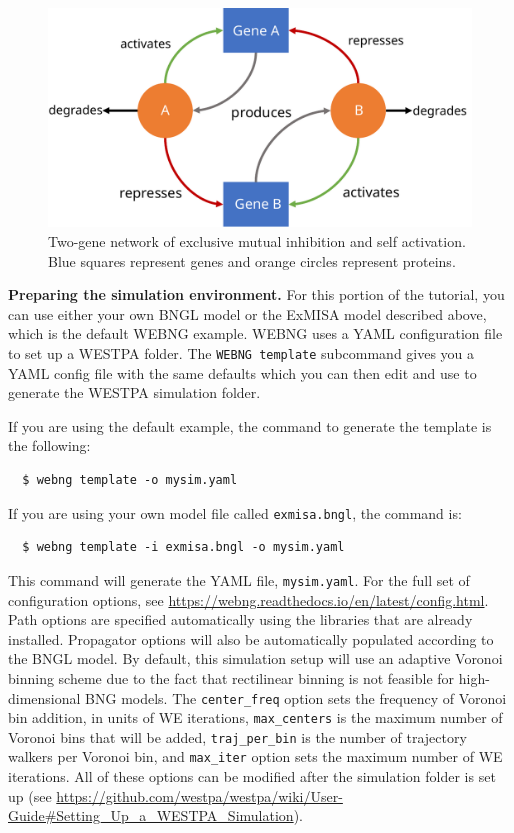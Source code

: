 \begin{figure}[t]
\centering
\includegraphics[width=\columnwidth]{figures/Figure13_Network.pdf}
\caption{Two-gene network of exclusive mutual inhibition and self activation.  Blue squares represent genes and orange circles represent proteins.}
\label{fig:two-gene-model}
\end{figure}

\textbf{Preparing the simulation environment.} For this portion of the tutorial, you can use either your own BNGL model or the ExMISA model described above, which is the default WEBNG example. 
WEBNG uses a YAML configuration file to set up a WESTPA folder. 
The \verb|WEBNG template| subcommand gives you a YAML config file with the same defaults which you can then edit and use to generate the WESTPA simulation folder. 

If you are using the default example, the command to generate the template is the following:
\begin{verbatim}
  $ webng template -o mysim.yaml 
\end{verbatim}

If you are using your own model file called \verb|exmisa.bngl|, the command is:
\begin{verbatim}
  $ webng template -i exmisa.bngl -o mysim.yaml
\end{verbatim}

This command will generate the YAML file, \verb|mysim.yaml|. For the full set of configuration options, see {\url{https://webng.readthedocs.io/en/latest/config.html}}. 
Path options are specified automatically using the libraries that are already installed. 
Propagator options will also be automatically populated according to the BNGL model. 
By default, this simulation setup will use an adaptive Voronoi binning scheme \citep{zhang_exact_2010} due to the fact that rectilinear binning is not feasible for high-dimensional BNG models. 
The \verb|center_freq| option sets the frequency of Voronoi bin addition, in units of WE iterations, \verb|max_centers| is the maximum number of Voronoi bins that will be added, \verb|traj_per_bin| is the number of trajectory walkers per Voronoi bin, and \verb|max_iter| option sets the maximum number of WE iterations. 
All of these options can be modified after the simulation folder is set up (see {\url{https://github.com/westpa/westpa/wiki/User-Guide#Setting_Up_a_WESTPA_Simulation}}). 


